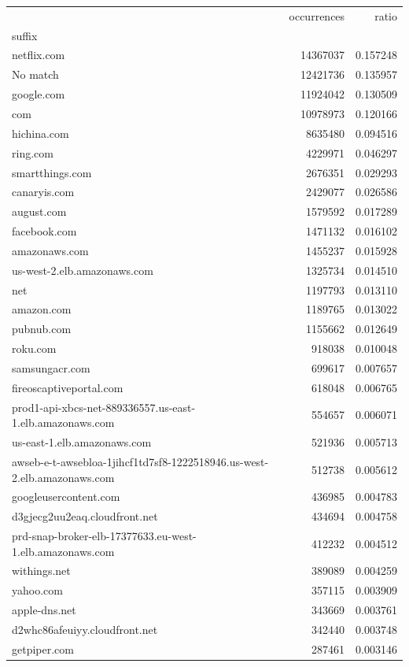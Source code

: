 \begin{tabular}{lrr}
\toprule
 & occurrences & ratio \\
suffix &  &  \\
\midrule
netflix.com & 14367037 & 0.157248 \\
No match & 12421736 & 0.135957 \\
google.com & 11924042 & 0.130509 \\
com & 10978973 & 0.120166 \\
hichina.com & 8635480 & 0.094516 \\
ring.com & 4229971 & 0.046297 \\
smartthings.com & 2676351 & 0.029293 \\
canaryis.com & 2429077 & 0.026586 \\
august.com & 1579592 & 0.017289 \\
facebook.com & 1471132 & 0.016102 \\
amazonaws.com & 1455237 & 0.015928 \\
us-west-2.elb.amazonaws.com & 1325734 & 0.014510 \\
net & 1197793 & 0.013110 \\
amazon.com & 1189765 & 0.013022 \\
pubnub.com & 1155662 & 0.012649 \\
roku.com & 918038 & 0.010048 \\
samsungacr.com & 699617 & 0.007657 \\
fireoscaptiveportal.com & 618048 & 0.006765 \\
prod1-api-xbcs-net-889336557.us-east-1.elb.amazonaws.com & 554657 & 0.006071 \\
us-east-1.elb.amazonaws.com & 521936 & 0.005713 \\
awseb-e-t-awsebloa-1jihcf1td7sf8-1222518946.us-west-2.elb.amazonaws.com & 512738 & 0.005612 \\
googleusercontent.com & 436985 & 0.004783 \\
d3gjecg2uu2eaq.cloudfront.net & 434694 & 0.004758 \\
prd-snap-broker-elb-17377633.eu-west-1.elb.amazonaws.com & 412232 & 0.004512 \\
withings.net & 389089 & 0.004259 \\
yahoo.com & 357115 & 0.003909 \\
apple-dns.net & 343669 & 0.003761 \\
d2whc86afeuiyy.cloudfront.net & 342440 & 0.003748 \\
getpiper.com & 287461 & 0.003146 \\

\end{tabular}
